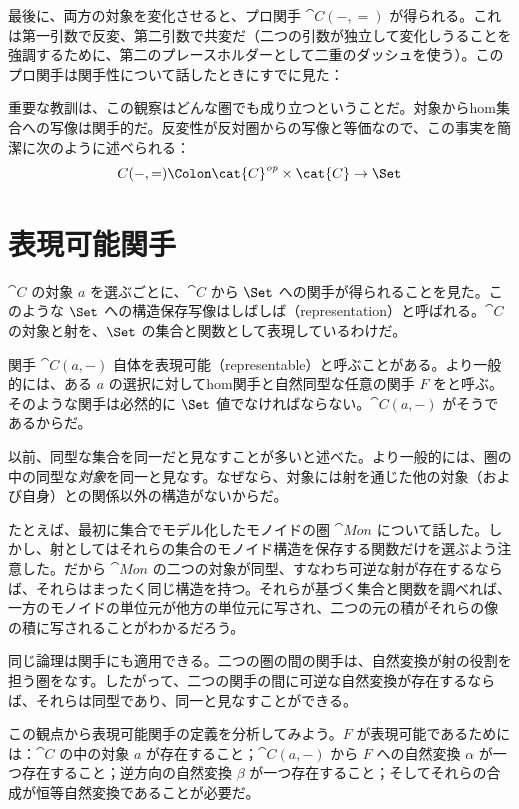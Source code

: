 最後に、両方の対象を変化させると、プロ関手 $\cat{C}(-, =)$ が得られる。これは第一引数で反変、第二引数で共変だ（二つの引数が独立して変化しうることを強調するために、第二のプレースホルダーとして二重のダッシュを使う）。このプロ関手は関手性について話したときにすでに見た：

重要な教訓は、この観察はどんな圏でも成り立つということだ。対象からhom集合への写像は関手的だ。反変性が反対圏からの写像と等価なので、この事実を簡潔に次のように述べられる：
\[C(-, =) \Colon \cat{C}^\mathit{op} \times \cat{C} \to \Set\]

\section{表現可能関手}

$\cat{C}$ の対象 $a$ を選ぶごとに、$\cat{C}$ から $\Set$ への関手が得られることを見た。このような $\Set$ への構造保存写像はしばしば（representation）と呼ばれる。$\cat{C}$ の対象と射を、$\Set$ の集合と関数として表現しているわけだ。

関手 $\cat{C}(a, -)$ 自体を表現可能（representable）と呼ぶことがある。より一般的には、ある $a$ の選択に対してhom関手と自然同型な任意の関手 $F$ をと呼ぶ。そのような関手は必然的に $\Set$ 値でなければならない。$\cat{C}(a, -)$ がそうであるからだ。

以前、同型な集合を同一だと見なすことが多いと述べた。より一般的には、圏の中の同型な\emph{対象}を同一と見なす。なぜなら、対象には射を通じた他の対象（および自身）との関係以外の構造がないからだ。

たとえば、最初に集合でモデル化したモノイドの圏 $\cat{Mon}$ について話した。しかし、射としてはそれらの集合のモノイド構造を保存する関数だけを選ぶよう注意した。だから $\cat{Mon}$ の二つの対象が同型、すなわち可逆な射が存在するならば、それらはまったく同じ構造を持つ。それらが基づく集合と関数を調べれば、一方のモノイドの単位元が他方の単位元に写され、二つの元の積がそれらの像の積に写されることがわかるだろう。

同じ論理は関手にも適用できる。二つの圏の間の関手は、自然変換が射の役割を担う圏をなす。したがって、二つの関手の間に可逆な自然変換が存在するならば、それらは同型であり、同一と見なすことができる。

この観点から表現可能関手の定義を分析してみよう。$F$ が表現可能であるためには：$\cat{C}$ の中の対象 $a$ が存在すること；$\cat{C}(a, -)$ から $F$ への自然変換 $\alpha$ が一つ存在すること；逆方向の自然変換 $\beta$ が一つ存在すること；そしてそれらの合成が恒等自然変換であることが必要だ。

